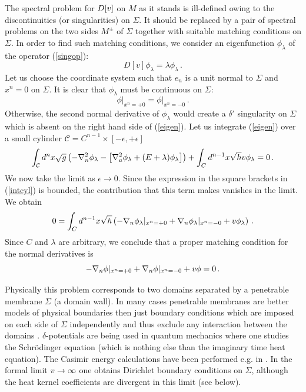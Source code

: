 The spectral problem
for $D[v ]$ on $M$ as it stands is ill-defined 
owing to the discontinuities (or
singularities) on $\Sigma$. It should be replaced by a pair of spectral
problems on the two sides
$M^\pm$ of
$\Sigma$ together with suitable matching conditions on $\Sigma$. In order to
find such matching conditions, we 
consider an eigenfunction $\phi_\lambda$ of the operator 
(\ref{singop}):
\begin{equation}
D[v]\phi_\lambda =\lambda \phi_\lambda \,.
\label{eigen}
\end{equation}
Let us choose the coordinate system such that $e_n$ is a unit normal
to $\Sigma$ and $x^n=0$ on $\Sigma$.
It is clear that $\phi_\lambda$ must be continuous on $\Sigma$:
\begin{equation}
\phi\vert_{x^n=+0}=\phi\vert_{x^n=-0} \,.\label{mc1}
\end{equation}
Otherwise, the second normal derivative of $\phi_\lambda$ would create
a $\delta'$ singularity on $\Sigma$ which is absent on the right
hand side of (\ref{eigen}). Let us integrate (\ref{eigen}) over
a small cylinder $\mathcal{C}=C^{n-1}\times [-\epsilon ,+\epsilon]$
\begin{equation}
\int_{\mathcal{C}} d^nx\sqrt{g} \left( -\nabla_n^2 \phi_\lambda
-\left[ \nabla_a^2 \phi_\lambda +(E+\lambda)\phi_\lambda \right]\right)
+\int_C d^{n-1}x\sqrt h v\phi_\lambda =0\,. \label{intcyl}
\end{equation} 
We now take the limit as $\epsilon\to 0$. Since the expression in the
square brackets in (\ref{intcyl}) is bounded, the contribution
that this term makes vanishes in the limit. We obtain
\begin{equation}
0=\int_C d^{n-1}x\sqrt h \left( -\nabla_n \phi_\lambda\vert_{x^n=+0}
+\nabla_n \phi_\lambda\vert_{x^n=-0} +v\phi_\lambda \right)\,.
\label{int2cyl}
\end{equation}
Since $C$ and $\lambda$ are arbitrary, we conclude that a proper
matching condition for the normal derivatives is
\begin{equation}
-\nabla_n \phi \vert_{x^n=+0}
+\nabla_n \phi \vert_{x^n=-0} +v\phi =0 \,.\label{dermatch}
\end{equation}

Physically this problem corresponds to two domains separated by a
penetrable membrane $\Sigma$ (a domain wall). In many cases penetrable
membranes are better models of physical boundaries then just boundary
conditions which are imposed on each side of $\Sigma$ independently
and thus exclude any interaction between the domains
\cite{Jaekel:1992bn,Actor:1995vc}. $\delta$-potentials
are being used in quantum mechanics \cite{Albeverio:1988}
where one studies the Schr\"{o}dinger equation (which is
nothing else than the imaginary time heat equation).
The Casimir energy calculations have been performed e.g. in
\cite{Scandurra:1998xa}.
In the formal limit
$v\to\infty$ one obtains Dirichlet boundary conditions 
on $\Sigma$, although the heat kernel coefficients are divergent in this
limit (see below).

